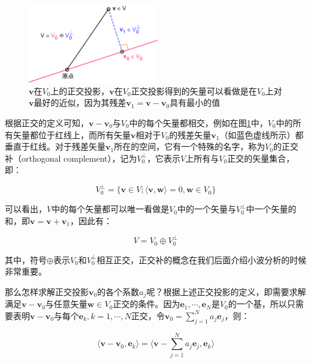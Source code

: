 \begin{figure}
	\sidecaption
	\includegraphics[width=0.51\textwidth]{figures/r/projection}
	\caption{$\mathbf{v}$在$V_0$上的正交投影，$\mathbf{v}$在$V_0$正交投影得到的矢量可以看做是在$V_0$上对$\mathbf{v}$最好的近似，因为其残差$\mathbf{v}_1=\mathbf{v}-\mathbf{v}_0$具有最小的值}
	\label{f:r-projection}
\end{figure}

根据正交的定义可知，$\mathbf{v}-\mathbf{v}_0$与$V_0$中的每个矢量都相交，例如在图\ref{f:r-projection}中，$V_0$中的所有矢量都位于红线上，而所有矢量$\mathbf{v}$相对于$V_0$的残差矢量$\mathbf{v}_1$（如蓝色虚线所示）都垂直于红线。对于残差矢量$\mathbf{v}_1$所在的空间，它有一个特殊的名字，称为$V_0$的正交补（orthogonal complement），记为$V^{\perp}_0$，它表示$V$上所有与$V_0$正交的矢量集合，即：

\begin{equation}\label{e:r-orthogonal-complement-1}
	V^{\perp}_0=\{\mathbf{v}\in V;\langle\mathbf{v},\mathbf{w}\rangle=0,\mathbf{w}\in V_0\}	
\end{equation}

\noindent 可以看出，$V$中的每个矢量都可以唯一看做是$V_0$中的一个矢量与$V^{\perp}_0$中一个矢量的和，即$\mathbf{v}=\mathbf{v}+\mathbf{v}_1$，因此有：

\begin{equation}\label{e:r-orthogonal-complement-2}
	V=V_0\oplus V^{\perp}_0
\end{equation}

\noindent 其中，符号$\oplus$表示$V_0$和$V^{\perp}_0$相互正交，正交补的概念在我们后面介绍小波分析的时候非常重要。

那么怎样求解正交投影$\mathbf{v}_0$的各个系数$a_j$呢？根据上述正交投影的定义，即需要求解满足$\mathbf{v}-\mathbf{v}_0$与任意矢量$\mathbf{w}\in V_0$正交的条件。因为$\mathbf{e}_1,\cdots,\mathbf{e}_N$是$V_0$的一个基，所以只需要表明$\mathbf{v}-\mathbf{v}_0$与每个$\mathbf{e}_k,k=1,\cdots,N$正交，令$\mathbf{v}_0=\sum^{N}_{j=1}a_j\mathbf{e}_j$，则：

\begin{equation}
	\langle\mathbf{v}-\mathbf{v}_0,\mathbf{e}_k\rangle=\langle\mathbf{v}-\sum^{N}_{j=1}a_j\mathbf{e}_j,\mathbf{e}_k\rangle
\end{equation}

